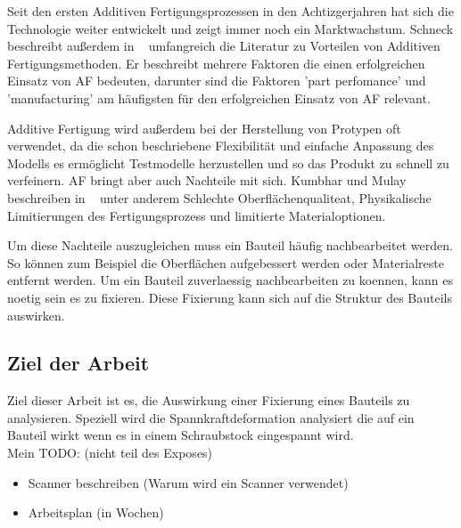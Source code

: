 \documentclass[../main.tex]{subfiles}
\begin{document}
    
    Seit den ersten Additiven Fertigungsprozessen in den Achtizgerjahren
    hat sich die Technologie weiter entwickelt und zeigt immer noch ein Marktwachstum.
    Schneck beschreibt außerdem in ~\cite{SCHNECK201919} umfangreich die Literatur zu Vorteilen von Additiven 
    Fertigungsmethoden. Er beschreibt mehrere Faktoren die einen erfolgreichen Einsatz von AF bedeuten, 
    darunter sind die Faktoren 'part perfomance' und 'manufacturing' am häufigsten für den erfolgreichen Einsatz von AF relevant.
    
    Additive Fertigung wird außerdem bei der Herstellung von Protypen oft verwendet, 
    da die schon beschriebene Flexibilität 
    und einfache Anpassung des Modells es ermöglicht Testmodelle herzustellen und 
    so das Produkt zu schnell zu verfeinern.    
    AF bringt aber auch Nachteile mit sich. Kumbhar und Mulay beschreiben in ~\cite{Kumbhar2018} unter anderem 
    Schlechte Oberflächenqualiteat, Physikalische Limitierungen des Fertigungsprozess und limitierte Materialoptionen.
    
    Um diese Nachteile auszugleichen muss ein Bauteil häufig nachbearbeitet werden. So können zum Beispiel die Oberflächen 
    aufgebessert werden oder Materialreste entfernt werden. Um ein Bauteil zuverlaessig nachbearbeiten zu koennen, 
    kann es noetig sein es zu fixieren.
    Diese Fixierung kann sich auf die Struktur des Bauteils auswirken.

    \subsection*{Ziel der Arbeit}
    Ziel dieser Arbeit ist es, die Auswirkung einer Fixierung eines Bauteils zu analysieren.
    Speziell wird die Spannkraftdeformation analysiert die auf ein Bauteil wirkt wenn es in einem
    Schraubstock eingespannt wird.\\
    
Mein TODO: (nicht teil des Exposes)
\begin{itemize}
    \item Scanner beschreiben (Warum wird ein Scanner verwendet)
    \item Arbeitsplan (in Wochen)
\end{itemize}
\end{document}
